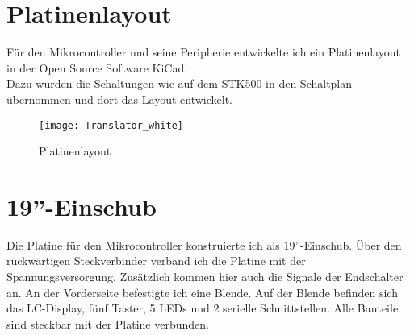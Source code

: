 \section{Platinenlayout}
Für den Mikrocontroller und seine Peripherie entwickelte ich ein Platinenlayout in der Open Source Software KiCad. \\ 
Dazu wurden die Schaltungen wie auf dem STK500 in den Schaltplan übernommen und dort das Layout entwickelt. 
\begin{figure}[htb]
\centering
\texttt{[image: Translator\_white]}
\caption{Platinenlayout}
\label{fig:Platine}
\end{figure}
\section{19''-Einschub}
Die Platine für den Mikrocontroller konstruierte ich als 19''-Einschub. Über den rückwärtigen Steckverbinder verband ich die Platine mit der Spannungsversorgung. Zusätzlich kommen hier auch die Signale der Endschalter an.
An der Vorderseite befestigte ich eine Blende. Auf der Blende befinden sich das LC-Display, fünf Taster, 5 LEDs und 2 serielle Schnittstellen. Alle Bauteile sind steckbar mit der Platine verbunden. 